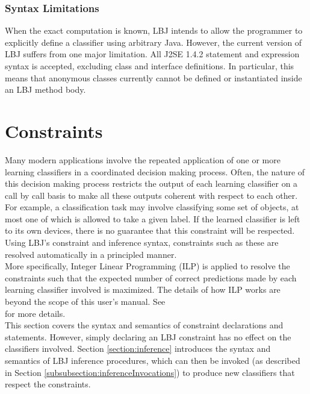 \subsubsection{Syntax Limitations}
When the exact computation is known, LBJ intends to allow the programmer to
explicitly define a classifier using arbitrary Java.  However, the current
version of LBJ suffers from one major limitation.  All J2SE 1.4.2 statement
and expression syntax is accepted, excluding class and interface definitions.
In particular, this means that anonymous classes currently cannot be defined
or instantiated inside an LBJ method body.

\section{Constraints} \label{section:constraints}

Many modern applications involve the repeated application of one or more
learning classifiers in a coordinated decision making process.  Often, the
nature of this decision making process restricts the output of each learning
classifier on a call by call basis to make all these outputs coherent with
respect to each other.  For example, a classification task may involve
classifying some set of objects, at most one of which is allowed to take a
given label.  If the learned classifier is left to its own devices, there is
no guarantee that this constraint will be respected.  Using LBJ's constraint
and inference syntax, constraints such as these are resolved automatically in
a principled manner. \\

More specifically, Integer Linear Programming (ILP) is applied to resolve the
constraints such that the expected number of correct predictions made by each
learning classifier involved is maximized.  The details of how ILP works are
beyond the scope of this user's manual.  See\\ \cite{PunyakanokRoYi08} for
more details. \\

This section covers the syntax and semantics of constraint declarations and
statements.  However, simply declaring an LBJ constraint has no effect on the
classifiers involved.  Section \ref{section:inference} introduces the syntax
and semantics of LBJ inference procedures, which can then be invoked (as
described in Section \ref{subsubsection:inferenceInvocations}) to produce new
classifiers that respect the constraints.

